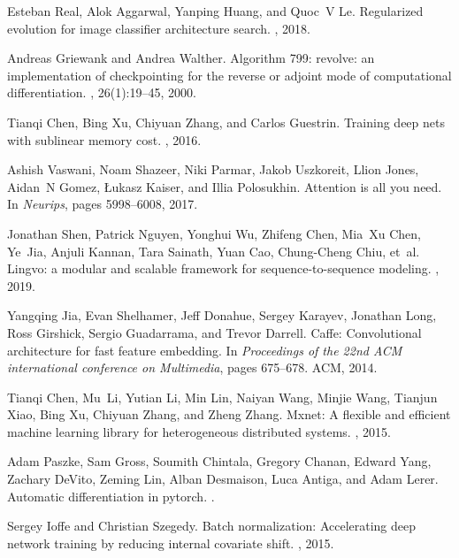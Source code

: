 \documentclass{article}
\begin{document}
\begin{thebibliography}{10}
Esteban Real, Alok Aggarwal, Yanping Huang, and Quoc~V Le.
\newblock Regularized evolution for image classifier architecture search.
, 2018.

Andreas Griewank and Andrea Walther.
\newblock Algorithm 799: revolve: an implementation of checkpointing for the
  reverse or adjoint mode of computational differentiation.
, 26(1):19--45,
  2000.

Tianqi Chen, Bing Xu, Chiyuan Zhang, and Carlos Guestrin.
\newblock Training deep nets with sublinear memory cost.
, 2016.

Ashish Vaswani, Noam Shazeer, Niki Parmar, Jakob Uszkoreit, Llion Jones,
  Aidan~N Gomez, {\L}ukasz Kaiser, and Illia Polosukhin.
\newblock Attention is all you need.
\newblock In {\em Neurips}, pages 5998--6008, 2017.

Jonathan Shen, Patrick Nguyen, Yonghui Wu, Zhifeng Chen, Mia~Xu Chen, Ye~Jia,
  Anjuli Kannan, Tara Sainath, Yuan Cao, Chung-Cheng Chiu, et~al.
\newblock Lingvo: a modular and scalable framework for sequence-to-sequence
  modeling.
, 2019.

Yangqing Jia, Evan Shelhamer, Jeff Donahue, Sergey Karayev, Jonathan Long, Ross
  Girshick, Sergio Guadarrama, and Trevor Darrell.
\newblock Caffe: Convolutional architecture for fast feature embedding.
\newblock In {\em Proceedings of the 22nd ACM international conference on
  Multimedia}, pages 675--678. ACM, 2014.

Tianqi Chen, Mu~Li, Yutian Li, Min Lin, Naiyan Wang, Minjie Wang, Tianjun Xiao,
  Bing Xu, Chiyuan Zhang, and Zheng Zhang.
\newblock Mxnet: A flexible and efficient machine learning library for
  heterogeneous distributed systems.
, 2015.

Adam Paszke, Sam Gross, Soumith Chintala, Gregory Chanan, Edward Yang, Zachary
  DeVito, Zeming Lin, Alban Desmaison, Luca Antiga, and Adam Lerer.
\newblock Automatic differentiation in pytorch.
.

Sergey Ioffe and Christian Szegedy.
\newblock Batch normalization: Accelerating deep network training by reducing
  internal covariate shift.
, 2015.


\end{thebibliography}
\end{document}
